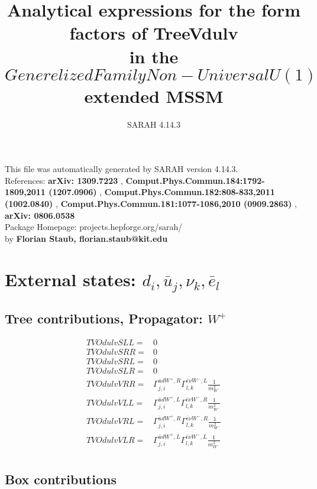 \documentclass[A4,landscape]{article}
\begin{document}
\title{Analytical expressions for the form factors of TreeVdulv\\ in the $Generelized Family Non-Universal U(1)$ extended MSSM } 
 \author{SARAH 4.14.3} 
 \maketitle 
 \vspace{10cm} 
This file was automatically generated by SARAH version 4.14.3.  \\ 
References: {\bf arXiv: 1309.7223 }, {\bf Comput.Phys.Commun.184:1792-1809,2011 (1207.0906) }, {\bf Comput.Phys.Commun.182:808-833,2011 (1002.0840) }, {\bf Comput.Phys.Commun.181:1077-1086,2010 (0909.2863) }, {\bf arXiv: 0806.0538 } \\ 
Package Homepage: projects.hepforge.org/sarah/ \\ 
by {\bf Florian Staub, florian.staub@kit.edu} 
 \pagebreak 
 \tableofcontents 
 \pagebreak 
\section{External states: ${d_{{i}}, \bar{u}_{{j}}, \nu_{{k}}, \bar{e}_{{l}}}$} 
\subsection{Tree contributions, Propagator: $W^+$} 

\begin{align} 
  TVOdulvSLL= & 0 \\ 
  TVOdulvSRR= & 0 \\ 
  TVOdulvSRL= & 0 \\ 
  TVOdulvSLR= & 0 \\ 
  TVOdulvVRR= & \Gamma^{\bar{u}d W^+,R}_{j, i} \Gamma^{\bar{e}\nu W^- ,L}_{l, k} \frac{1}{m^2_{W^-}} \\ 
  TVOdulvVLL= & \Gamma^{\bar{u}d W^+,L}_{j, i} \Gamma^{\bar{e}\nu W^- ,R}_{l, k} \frac{1}{m^2_{W^-}} \\ 
  TVOdulvVRL= & \Gamma^{\bar{u}d W^+,R}_{j, i} \Gamma^{\bar{e}\nu W^- ,R}_{l, k} \frac{1}{m^2_{W^-}} \\ 
  TVOdulvVLR= & \Gamma^{\bar{u}d W^+,L}_{j, i} \Gamma^{\bar{e}\nu W^- ,L}_{l, k} \frac{1}{m^2_{W^-}} \\ 
\end{align} 
\subsection{Box contributions} 
\end{document}
